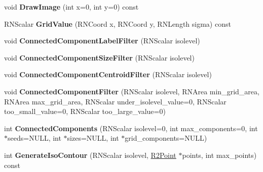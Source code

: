 \begin{DoxyCompactItemize}
\item 
void {\bfseries Draw\+Image} (int x=0, int y=0) const \hypertarget{class_r2_grid_a234820c994b71f23d3d44716d72ab74a}{}\label{class_r2_grid_a234820c994b71f23d3d44716d72ab74a}

\item 
R\+N\+Scalar {\bfseries Grid\+Value} (R\+N\+Coord x, R\+N\+Coord y, R\+N\+Length sigma) const \hypertarget{class_r2_grid_a741cfc9cd34c10327bd9b8176cff1b84}{}\label{class_r2_grid_a741cfc9cd34c10327bd9b8176cff1b84}

\item 
void {\bfseries Connected\+Component\+Label\+Filter} (R\+N\+Scalar isolevel)\hypertarget{class_r2_grid_a4995c03cc440722901aba2b6fc23d05c}{}\label{class_r2_grid_a4995c03cc440722901aba2b6fc23d05c}

\item 
void {\bfseries Connected\+Component\+Size\+Filter} (R\+N\+Scalar isolevel)\hypertarget{class_r2_grid_a041b0ef60cc366340d5b722456ad7e30}{}\label{class_r2_grid_a041b0ef60cc366340d5b722456ad7e30}

\item 
void {\bfseries Connected\+Component\+Centroid\+Filter} (R\+N\+Scalar isolevel)\hypertarget{class_r2_grid_acc3499ce484f6299c0a72b20d25b5841}{}\label{class_r2_grid_acc3499ce484f6299c0a72b20d25b5841}

\item 
void {\bfseries Connected\+Component\+Filter} (R\+N\+Scalar isolevel, R\+N\+Area min\+\_\+grid\+\_\+area, R\+N\+Area max\+\_\+grid\+\_\+area, R\+N\+Scalar under\+\_\+isolevel\+\_\+value=0, R\+N\+Scalar too\+\_\+small\+\_\+value=0, R\+N\+Scalar too\+\_\+large\+\_\+value=0)\hypertarget{class_r2_grid_a549c5c4458a543bf144c50b99ff21195}{}\label{class_r2_grid_a549c5c4458a543bf144c50b99ff21195}

\item 
int {\bfseries Connected\+Components} (R\+N\+Scalar isolevel=0, int max\+\_\+components=0, int $\ast$seeds=N\+U\+LL, int $\ast$sizes=N\+U\+LL, int $\ast$grid\+\_\+components=N\+U\+LL)\hypertarget{class_r2_grid_aa41ac8ab0847c09b5d18259dcadeab9f}{}\label{class_r2_grid_aa41ac8ab0847c09b5d18259dcadeab9f}

\item 
int {\bfseries Generate\+Iso\+Contour} (R\+N\+Scalar isolevel, \hyperlink{class_r2_point}{R2\+Point} $\ast$points, int max\+\_\+points) const \hypertarget{class_r2_grid_ade127c69cf9abc07f28addc1204a288f}{}\label{class_r2_grid_ade127c69cf9abc07f28addc1204a288f}


\end{DoxyCompactItemize}
